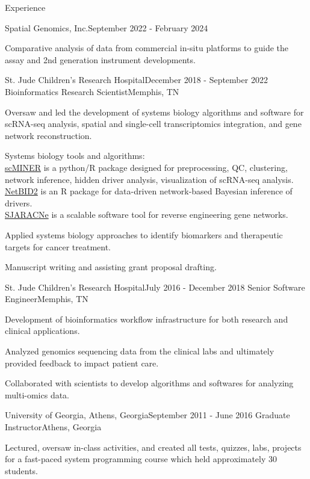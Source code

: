 \documentclass{resume} %
\begin{document}
\begin{rSection}{Experience}
\begin{rSubsection}{Spatial Genomics, Inc.}{September 2022 - February 2024}
\item Comparative analysis of data from commercial in-situ platforms to guide the assay and 2nd generation instrument developments.
\end{rSubsection}


\begin{rSubsection}{St. Jude Children's Research Hospital}{December 2018 - September 2022}
{Bioinformatics Research Scientist}{Memphis, TN}
\item Oversaw and led the development of systems biology algorithms and software for scRNA-seq analysis, spatial and single-cell transcriptomics integration, and gene network reconstruction.

Systems biology tools and algorithms:\\
\href{https://www.nature.com/articles/s41467-025-59620-6}{scMINER} is a python/R package designed for preprocessing, QC, clustering, network inference, hidden driver analysis, visualization of scRNA-seq analysis.\\
\href{https://www.nature.com/articles/s41467-023-38335-6}{NetBID2} is an R package for data-driven network-based Bayesian inference of drivers.\\
\href{https://github.com/jyyulab/SJARACNe}{SJARACNe} is a scalable software tool for reverse engineering gene networks.

Applied systems biology approaches to identify biomarkers and therapeutic targets for cancer treatment.

Manuscript writing and assisting grant proposal drafting.
\end{rSubsection}


\begin{rSubsection}{St. Jude Children's Research Hospital}{July 2016 - December 2018}
{Senior Software Engineer}{Memphis, TN}
\item Development of bioinformatics workflow infrastructure for both research and clinical applications.

\item Analyzed genomics sequencing data from the clinical labs and ultimately provided feedback to impact patient care.

\item Collaborated with scientists to develop algorithms and softwares for analyzing multi-omics data.
\end{rSubsection}


\begin{rSubsection}{University of Georgia, Athens, Georgia}{September 2011 - June 2016}
{Graduate Instructor}{Athens, Georgia}
\item Lectured, oversaw in-class activities, and created all tests, quizzes, labs, projects for a fast-paced system programming course which held approximately 30 students.


\end{rSubsection}
\end{rSection}
\end{document}
